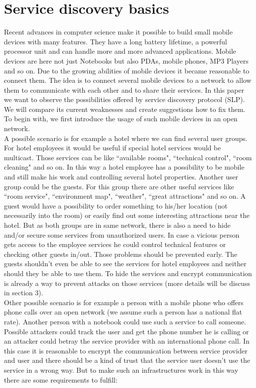 \section{Service discovery basics}\label{sec:intro}
Recent advances in computer science make it possible to build small mobile devices with many features. They have a long battery lifetime, a powerful processor unit and can handle more and more advanced applications. Mobile devices are here not just Notebooks but also PDAs, mobile phones, MP3 Players and so on. Due to the growing abilities of mobile devices it became reasonable to connect them. The idea is to connect several mobile devices to a network to allow them to communicate with each other and to share their services. In this paper we want to observe the possibilities offered by service discovery protocol (SLP). We will compare its current weaknesses and create suggestions how to fix them. To begin with, we first introduce the usage of such mobile devices in an open network.\\
A possible scenario is for example a hotel where we can find several user groups. For hotel employees it would be useful if special hotel services would be multicast. Those services can be like ``available rooms", ``technical control", ``room cleaning" and so on. In this way a hotel employee has a possibility to be mobile and still make his work and controlling several hotel properties. Another user group could be the guests. For this group there are other useful services like ``room service", ``environment map", ``weather", ``great attractions" and so on. A guest would have a possibility to order something to his/her location (not necessarily into the room) or easily find out some interesting attractions near the hotel. But as both groups are in same network, there is also a need to hide and/or secure some services from unauthorized users. In case a vicious person gets access to the employee services he could control technical features or checking other guests in/out. Those problems should be prevented early. The guests shouldn't even be able to see the services for hotel employees and neither should they be able to use them. To hide the services and encrypt communication is already a way to prevent attacks on those services (more details will be discuss in section 3).\\
Other possible scenario is for example a person with a mobile phone who offers phone calls over an open network (we assume such a person has a national flat rate). Another person with a notebook could use such a service to call someone. Possible attackers could track the user and get the phone number he is calling or an attacker could betray the service provider with an international phone call. In this case it is reasonable to encrypt the communication between service provider and user and there should be a kind of trust that the service user doesn't use the service in a wrong way. But to make such an infrastructures work in this way there are some requirements to fulfill: 

